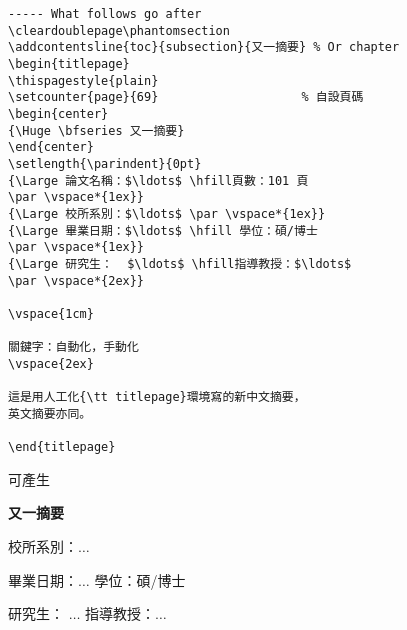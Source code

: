\begin{appendB}
\begin{Verbatim}[frame=single,firstline=1,lastline=30,rulecolor=\color{red},label=Another abstract]
----- What follows go after 
\cleardoublepage\phantomsection
\addcontentsline{toc}{subsection}{又一摘要} % Or chapter
\begin{titlepage}
\thispagestyle{plain}
\setcounter{page}{69}                    % 自設頁碼
\begin{center}
{\Huge \bfseries 又一摘要}
\end{center}
\setlength{\parindent}{0pt}
{\Large 論文名稱：$\ldots$ \hfill頁數：101 頁
\par \vspace*{1ex}}
{\Large 校所系別：$\ldots$ \par \vspace*{1ex}}
{\Large 畢業日期：$\ldots$ \hfill 學位：碩/博士 
\par \vspace*{1ex}}
{\Large 研究生：  $\ldots$ \hfill指導教授：$\ldots$ 
\par \vspace*{2ex}}

\vspace{1cm}

關鍵字：自動化，手動化
\vspace{2ex}

這是用人工化{\tt titlepage}環境寫的新中文摘要，
英文摘要亦同。

\end{titlepage}
\end{Verbatim}

可產生

\cleardoublepage{}
{}  %
\begin{titlepage}
\thispagestyle{plain}
\setcounter{page}{69}                                %
\begin{center}
{\Huge \bfseries 又一摘要}
\end{center}
\setlength{\parindent}{0pt}
{\Large 校所系別：$\ldots$ \par \vspace*{1ex}}
{\Large 畢業日期：$\ldots$ \hfill 學位：碩/博士 \par \vspace*{1ex}}
{\Large 研究生：    $\ldots$ \hfill 指導教授：$\ldots$ \par \vspace*{2ex}}


\end{titlepage}
\end{appendB}
